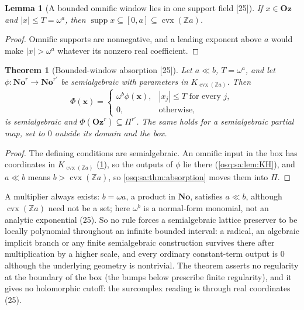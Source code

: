 \documentclass[11pt,letterpaper]{article}
\numberwithin{equation}{section}
\newtheorem{theorem}{Theorem}[section]
\newtheorem{lemma}[lemma]{Lemma}
\theoremstyle{definition}
\theoremstyle{remark}
\theoremstyle{plain}
\newcommand{\No}{\mathbf{No}}
\newcommand{\Oz}{\mathbf{Oz}}
\newcommand{\Z}{\mathbb Z}
\newcommand{\supp}{\operatorname{supp}}
\newcommand{\src}[1]{\textup{\textsf{[#1]}}}
\begin{document}
\begin{lemma}[A bounded omnific window lies in one support field \src{25}]\label{osq:sa:lem:window}
If $x\in\Oz$ and $|x|\le T=\omega^a$, then $\supp x\subseteq[0,a]\subseteq\operatorname{cvx}(\Z a)$.
\end{lemma}
\begin{proof}
Omnific supports are nonnegative, and a leading exponent above $a$ would make $|x|>\omega^a$ whatever its nonzero real coefficient.
\end{proof}

\begin{theorem}[Bounded-window absorption \src{25}]\label{osq:sa:thm:window}
Let $a\ll b$, $T=\omega^a$, and let $\phi:\No^r\to\No^{r'}$ be semialgebraic with parameters in $K_{\operatorname{cvx}(\Z a)}$. Then
\begin{equation}\label{osq:sa:eq:window}
 \Phi(\mathbf x)=\begin{cases}\omega^b\phi(\mathbf x),&|x_j|\le T\text{ for every }j,\\ 0,&\text{otherwise},\end{cases}
\end{equation}
is semialgebraic and $\Phi(\Oz^r)\subseteq\Pi^{r'}$. The same holds for a semialgebraic partial map, set to $0$ outside its domain and the box.
\end{theorem}
\begin{proof}
The defining conditions are semialgebraic. An omnific input in the box has coordinates in $K_{\operatorname{cvx}(\Z a)}$ (\cref{osq:sa:lem:window}), so the
outputs of $\phi$ lie there (\cref{osq:sa:lem:KH}), and $a\ll b$ means $b>\operatorname{cvx}(\Z a)$, so \cref{osq:sa:thm:absorption} moves them into $\Pi$.
\end{proof}

A multiplier always exists: $b=\omega a$, a product in $\No$, satisfies $a\ll b$, although $\operatorname{cvx}(\Z a)$ need not be a set; here
$\omega^b$ is a normal-form monomial, not an analytic exponential (25). So no rule forces a semialgebraic lattice preserver to be locally polynomial
throughout an infinite bounded interval: a radical, an algebraic implicit
branch or any finite semialgebraic construction survives there after multiplication by a higher scale, and every ordinary constant-term output is $0$
although the underlying geometry is nontrivial. The theorem asserts no regularity at the boundary of the box (the bumps below prescribe finite
regularity), and it gives no holomorphic cutoff: the surcomplex reading is through real coordinates (25).
\end{document}
